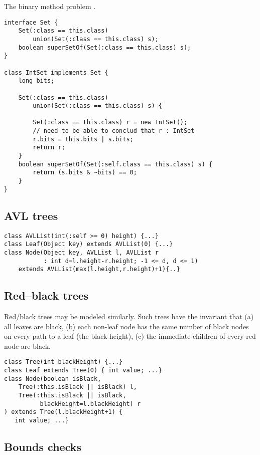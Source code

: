 The binary method problem \cite{bruce-binary}.
{\footnotesize
\begin{verbatim}
interface Set {
    Set(:class == this.class)
        union(Set(:class == this.class) s);
    boolean superSetOf(Set(:class == this.class) s);
}

class IntSet implements Set {
    long bits;

    Set(:class == this.class)
        union(Set(:class == this.class) s) {

        Set(:class == this.class) r = new IntSet();
        // need to be able to conclud that r : IntSet
        r.bits = this.bits | s.bits;
        return r;
    }
    boolean superSetOf(Set(:self.class == this.class) s) {
        return (s.bits & ~bits) == 0;
    }
}
\end{verbatim}}

\subsection{AVL trees}

{\footnotesize
\begin{verbatim}
class AVLList(int(:self >= 0) height) {...}
class Leaf(Object key) extends AVLList(0) {...}
class Node(Object key, AVLList l, AVLList r
           : int d=l.height-r.height; -1 <= d, d <= 1) 
    extends AVLList(max(l.height,r.height)+1){..}
\end{verbatim}}

\subsection{Red--black trees}
Red/black trees may be modeled similarly. Such trees have the
invariant that (a) all leaves are black, (b) each non-leaf node has
the same number of black nodes on every path to a leaf (the black
height), (c) the immediate children of every red node are black.
{\footnotesize
\begin{verbatim}
class Tree(int blackHeight) {...}
class Leaf extends Tree(0) { int value; ...}
class Node(boolean isBlack, 
    Tree(:this.isBlack || isBlack) l, 
    Tree(:this.isBlack || isBlack, 
          blackHeight=l.blackHeight) r 
) extends Tree(l.blackHeight+1) { 
   int value; ...}
\end{verbatim}}

\subsection{Bounds checks}

